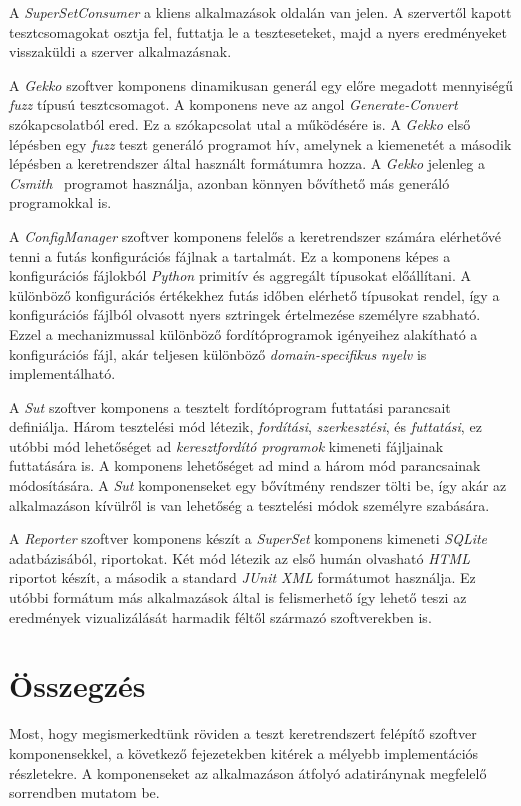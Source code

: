     A \textit{SuperSetConsumer} a kliens alkalmazások oldalán van jelen. A szervertől kapott tesztcsomagokat osztja
    fel, futtatja le a teszteseteket, majd a nyers eredményeket visszaküldi a szerver alkalmazásnak.

    A \textit{Gekko} szoftver komponens dinamikusan generál egy előre megadott mennyiségű \textit{fuzz} típusú
    tesztcsomagot. A komponens neve az angol \emph{Generate-Convert} szókapcsolatból ered. Ez a szókapcsolat utal a
    működésére is. A \textit{Gekko} első lépésben egy \textit{fuzz} teszt generáló programot hív, amelynek a kiemenetét
    a második lépésben a keretrendszer által használt formátumra hozza. A \textit{Gekko} jelenleg a
    \textit{Csmith}~\cite{csmith} programot használja, azonban könnyen bővíthető más generáló programokkal is.

    A \textit{ConfigManager} szoftver komponens felelős a keretrendszer számára elérhetővé tenni a futás konfigurációs
    fájlnak a tartalmát. Ez a komponens képes a konfigurációs fájlokból \textit{Python} primitív és aggregált típusokat
    előállítani. A különböző konfigurációs értékekhez futás időben elérhető típusokat rendel, így a konfigurációs
    fájlból olvasott nyers sztringek értelmezése személyre szabható. Ezzel a mechanizmussal különböző fordítóprogramok
    igényeihez alakítható a konfigurációs fájl, akár teljesen különböző \textit{domain-specifikus nyelv} is
    implementálható.

    A \textit{Sut} szoftver komponens a tesztelt fordítóprogram futtatási parancsait definiálja. Három tesztelési mód
    létezik, \emph{fordítási}, \emph{szerkesztési}, és \emph{futtatási}, ez utóbbi mód lehetőséget ad
    \emph{keresztfordító programok} kimeneti fájljainak futtatására is. A komponens lehetőséget ad mind a három mód
    parancsainak módosítására. A \textit{Sut} komponenseket egy bővítmény rendszer tölti be, így akár az alkalmazáson
    kívülről is van lehetőség a tesztelési módok személyre szabására.

    A \textit{Reporter} szoftver komponens készít a \textit{SuperSet} komponens kimeneti \textit{SQLite} adatbázisából,
    riportokat. Két mód létezik az első humán olvasható \textit{HTML} riportot készít, a második a standard
    \textit{JUnit XML} formátumot használja. Ez utóbbi formátum más alkalmazások által is felismerhető így lehető teszi
    az eredmények vizualizálását harmadik féltől származó szoftverekben is.

\section{Összegzés}\label{sec:ch2-summary}

    Most, hogy megismerkedtünk röviden a teszt keretrendszert felépítő szoftver komponensekkel, a következő
    fejezetekben kitérek a mélyebb implementációs részletekre. A komponenseket az alkalmazáson átfolyó adatiránynak
    megfelelő sorrendben mutatom be.
